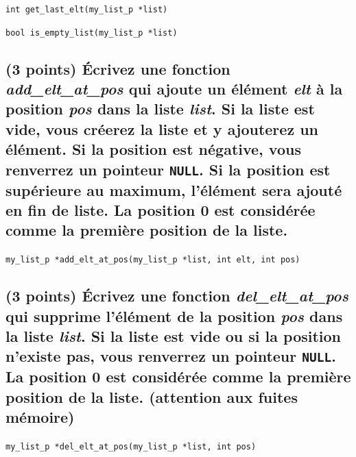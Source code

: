 \documentclass[11pt,a4paper]{article}
\begin{document}
\begin{center}
\end{center}

\medskip

\texttt{int get\_last\_elt(my\_list\_p *list)}

\begin{center}
\end{center}

\medskip

\texttt{bool is\_empty\_list(my\_list\_p *list)}

\begin{center}
\end{center}


\vfillLast

\newpage

\subsection{(3 points) \'Ecrivez une fonction \og \textit{add\_elt\_at\_pos} \fg{} qui ajoute un élément \textit{elt} à la position \textit{pos} dans la liste \textit{list}. Si la liste est vide, vous créerez la liste et y ajouterez un élément. Si la position est négative, vous renverrez un pointeur \texttt{NULL}. Si la position est supérieure au maximum, l'élément sera ajouté en fin de liste. La position 0 est considérée comme la première position de la liste. }

\bigskip

\texttt{my\_list\_p *add\_elt\_at\_pos(my\_list\_p *list, int elt, int pos)}

\begin{center}
\end{center}

\newpage

\subsection{(3 points) \'Ecrivez une fonction \og \textit{del\_elt\_at\_pos} \fg{} qui supprime l'élément de la position \textit{pos} dans la liste \textit{list}. Si la liste est vide ou si la position n'existe pas, vous renverrez un pointeur \texttt{NULL}. La position 0 est considérée comme la première position de la liste. (attention aux fuites mémoire) }

\bigskip

\texttt{my\_list\_p *del\_elt\_at\_pos(my\_list\_p *list, int pos)}
\end{document}

